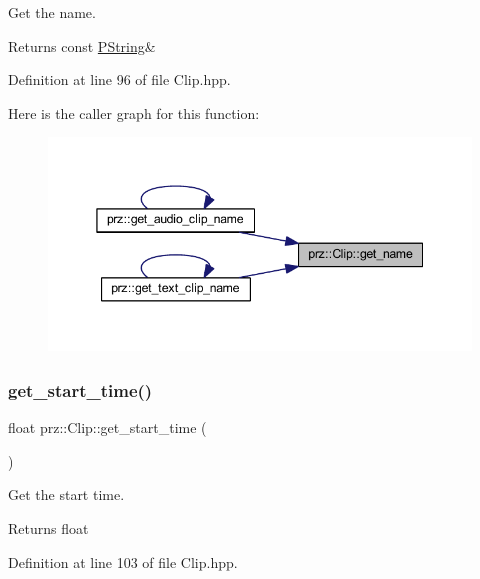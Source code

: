 Get the name. 

\begin{DoxyReturn}{Returns}
const \mbox{\hyperlink{classprz_1_1_p_string}{P\+String}}\& 
\end{DoxyReturn}


Definition at line 96 of file Clip.\+hpp.

Here is the caller graph for this function\+:
\nopagebreak
\begin{figure}[H]
\begin{center}
\leavevmode
\includegraphics[width=345pt]{classprz_1_1_clip_accaf42d7a82d41ad70032870981f8d83_icgraph}
\end{center}
\end{figure}
\mbox{\label{classprz_1_1_clip_a65df9388088c8a607e90b73506550cd5}} 
\subsubsection{\texorpdfstring{get\_start\_time()}{get\_start\_time()}}
{\footnotesize\ttfamily float prz\+::\+Clip\+::get\+\_\+start\+\_\+time (\begin{DoxyParamCaption}{ }\end{DoxyParamCaption})\hspace{0.3cm}{\ttfamily [inline]}}



Get the start time. 

\begin{DoxyReturn}{Returns}
float 
\end{DoxyReturn}


Definition at line 103 of file Clip.\+hpp.

